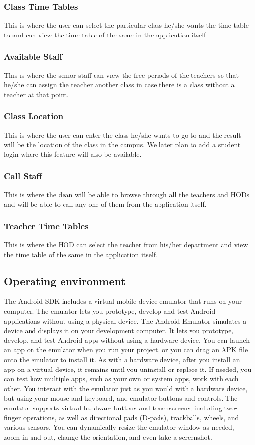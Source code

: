 \documentclass[BTech]{srmuthesis}
\begin{document}
\subsubsection{Class Time Tables}
This is where the user can select the particular class he/she wants the time table to and can view the time table of the same in the application itself.
\subsubsection{Available Staff}
This is where the senior staff can view the free periods of the teachers so that he/she can assign the teacher another class in case there is a class without a teacher at that point.
\subsubsection{Class Location}
This is where the user can enter the class he/she wants to go to and the result will be the location of the class in the campus. We later plan to add a student login where this feature will also be available.
\subsubsection{Call Staff}
This is where the dean will be able to browse through all the teachers and HODs and will be able to call any one of them from the application itself.
\subsubsection{Teacher Time Tables}
This is where the HOD can select the teacher from his/her department and view the time table of the same in the application itself.
\subsection{Operating environment}
The Android SDK includes a virtual mobile device emulator that runs on your computer. The
emulator lets you prototype, develop and test Android applications without using a physical
device. The Android Emulator simulates a device and displays it on your development computer.
It lets you prototype, develop, and test Android apps without using a hardware device. You can
launch an app on the emulator when you run your project, or you can drag an APK file onto the
emulator to install it. As with a hardware device, after you install an app on a virtual device, it
remains until you uninstall or replace it. If needed, you can test how multiple apps, such as your
own or system apps, work with each other. You interact with the emulator just as you would with
a hardware device, but using your mouse and keyboard, and emulator buttons and controls. The
emulator supports virtual hardware buttons and touchscreens, including two-finger operations, as
well as directional pads (D-pads), trackballs, wheels, and various sensors. You can dynamically
resize the emulator window as needed, zoom in and out, change the orientation, and even take a
screenshot.
\end{document}
